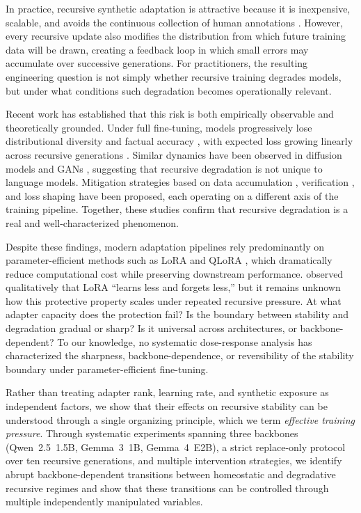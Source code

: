 \documentclass[a4paper,fleqn]{cas-dc}
\begin{document}
In practice, recursive synthetic adaptation is attractive because it is
inexpensive, scalable, and avoids the continuous collection of human
annotations \citep{liu2024bestpractices}. However, every recursive update also modifies the distribution from
which future training data will be drawn, creating a feedback loop in which
small errors may accumulate over successive generations. For practitioners, the
resulting engineering question is not simply whether recursive training degrades
models, but under what conditions such degradation becomes operationally
relevant.

Recent work has established that this risk is both empirically observable and
theoretically grounded. Under full fine-tuning, models progressively lose
distributional diversity \citep{shumailov2024} and factual accuracy
\citep{keisha2025}, with expected loss growing linearly across recursive
generations \citep{dohmatob2025}. Similar dynamics have been observed in
diffusion models and GANs \citep{alemohammad2024}, suggesting that recursive
degradation is not unique to language models. Mitigation strategies based on
data accumulation \citep{gerstgrasser2024}, verification \citep{yi2025}, and
loss shaping \citep{zibakhsh2024} have been proposed, each operating on a
different axis of the training pipeline. Together, these studies confirm that
recursive degradation is a real and well-characterized phenomenon.

Despite these findings, modern adaptation pipelines rely predominantly on
parameter-efficient methods such as LoRA \citep{hu2022} and QLoRA
\citep{dettmers2023}, which dramatically reduce computational cost while
preserving downstream performance. \citet{biderman2024} observed qualitatively
that LoRA ``learns less and forgets less,'' but it remains unknown how this
protective property scales under repeated recursive pressure. At what adapter
capacity does the protection fail? Is the boundary between stability and
degradation gradual or sharp? Is it universal across architectures, or
backbone-dependent? To our knowledge, no systematic dose-response analysis has
characterized the sharpness, backbone-dependence, or reversibility of the
stability boundary under parameter-efficient fine-tuning.

Rather than treating adapter rank, learning rate, and synthetic exposure as
independent factors, we show that their effects on recursive stability can be
understood through a single organizing principle, which we term
\textit{effective training pressure}. Through systematic experiments spanning
three backbones (Qwen~2.5~1.5B, Gemma~3~1B, Gemma~4~E2B), a strict replace-only
protocol over ten recursive generations, and multiple intervention strategies, we
identify abrupt backbone-dependent transitions between homeostatic and degradative
recursive regimes and show that these transitions can be controlled through
multiple independently manipulated variables.
\end{document}
